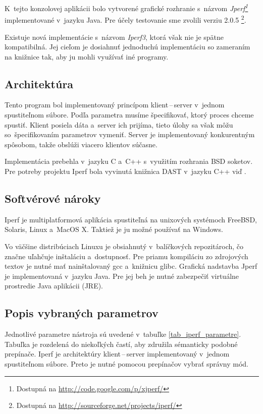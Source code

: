     K~tejto konzolovej aplikácii bolo vytvorené grafické rozhranie
    s~názvom \emph{Jperf\footnote{Dostupná na
    \url{http://code.google.com/p/xjperf/}}}
    implementované v~jazyku Java.
    Pre účely testovanie sme zvolili verziu 2.0.5
    \footnote{Dostupná na \url{http://sourceforge.net/projects/iperf/}}.

    Existuje nová implementácie s~názvom \emph{Iperf3}, ktorá však nie je spätne
    kompatibilná. Jej cieľom je dosiahnuť jednoduchú implementáciu
    so zameraním na knižnice tak, aby ju mohli využívať iné programy.

        \subsection{Architektúra}\label{iperf_arch}
        Tento program bol implementovaný princípom klient\,--\,server v~jednom
        spustiteľnom súbore. Podľa parametra musíme špecifikovať, ktorý proces 
        chceme spustiť.
        Klient posiela dáta a~server ich prijíma, tieto úlohy sa však môžu
        so~špecifikovaním parametrov vymeniť. Server je implementovaný konkurentným
        spôsobom, takže obslúži viacero klientov súčasne.
        
        Implementácia prebehla v~jazyku C a~C++ s~využitím rozhrania BSD
        soketov. Pre potreby projektu Iperf bola vyvinutá knižnica DAST v~jazyku C++
        viď \cite{iperf_dast}.

        \subsection{Softvérové nároky} \label{iperf_sw}
        Iperf je multiplatformová aplikácia spustiteľná na unixových systémoch
        FreeBSD, Solaris, Linux a~MacOS X. Taktiež je ju možné používať
        na Windows.

        Vo väčšine distribúciach Linuxu je obsiahnutý v~balíčkových
        repozitároch, čo značne uľahčuje inštaláciu a~dostupnosť. 
        Pre priamu kompiláciu zo zdrojových textov je nutné mať nainštalovaný
        gcc a~knižnicu glibc. 
        Grafická nadstavba Jperf je implementovaná v~jazyku Java. Pre jej beh
        je nutné zabezpečiť virtuálne prostredie Java aplikácii (JRE).

        \subsection{Popis vybraných parametrov} \label{iperf_param}
        Jednotlivé parametre nástroja sú uvedené v~tabuľke
        \ref{tab_iperf_parametre}. Tabuľka je rozdelená do niekoľkých častí, aby 
        združila sémanticky podobné prepínače. Iperf je architektúry
        klient\,--\,server implementovaný v~jednom spustiteľnom súbore. Preto 
        je nutné pomocou prepínačov vybrať správny mód.

